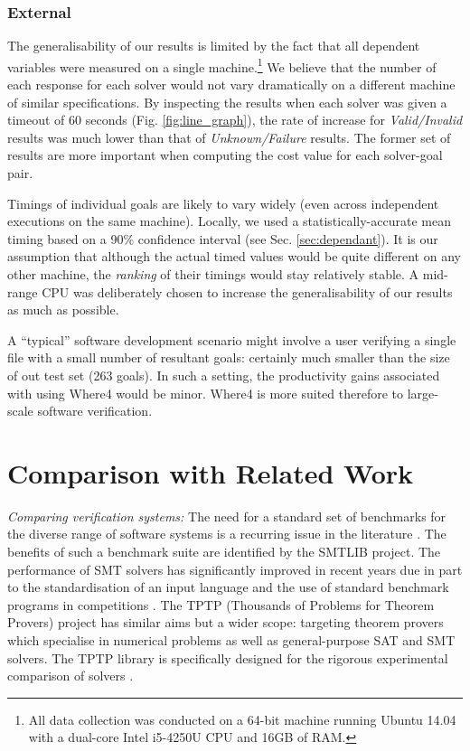 \documentclass[runningheads,a4paper]{llncs}
\begin{document}
\subsubsection{External}

The generalisability of our results is limited by the fact that all dependent variables were measured on a single machine.\footnote{All data collection was conducted on a 64-bit machine running Ubuntu 14.04 with a dual-core Intel i5-4250U CPU and 16GB of RAM.} We believe that the number of each response for each solver would not vary dramatically on a different machine of similar specifications. By inspecting the results when each solver was given a timeout of 60 seconds (Fig. \ref{fig:line_graph}), the rate of increase for \textit{Valid/Invalid} results was much lower than that of \textit{Unknown/Failure} results. The former set of results are more important when computing the cost value for each solver-goal pair.

Timings of individual goals are likely to vary widely (even across independent executions on the same machine). Locally, we used a statistically-accurate mean timing based on a 90\% confidence interval (see Sec. \ref{sec:dependant}). It is our assumption that although the actual timed values would be quite different on any other machine, the \textit{ranking} of their timings would stay relatively stable.   A mid-range CPU was deliberately chosen to increase the generalisability of our results as much as possible.

A ``typical'' software development scenario might involve a user verifying a single file with a small number of resultant goals: certainly much smaller than the size of out test set (263 goals). In such a setting, the productivity gains associated with using \textsf{Where4} would be minor. \textsf{Where4} is more suited therefore to large-scale software verification.


\section{Comparison with Related Work}
\label{sec:related}
\textit{Comparing verification systems:} The need for a standard set of benchmarks for the diverse range of software systems is a recurring issue in the literature \cite{Dagstuhl}. The benefits of such a benchmark suite are identified by the SMTLIB \cite{SMTLIB} project. The performance of SMT solvers has significantly improved in recent years due in part to the standardisation of an input language and the use of standard benchmark programs in  competitions \cite{SMTEVAL2013}\cite{SVCOMP}. The TPTP (Thousands of Problems for Theorem Provers) project \cite{TPTP} has similar aims but a wider scope: targeting theorem provers which specialise in numerical problems as well as general-purpose SAT and SMT solvers. The TPTP library is specifically designed for the rigorous experimental comparison of solvers \cite{Sutcliffe200139}.           
\end{document}

